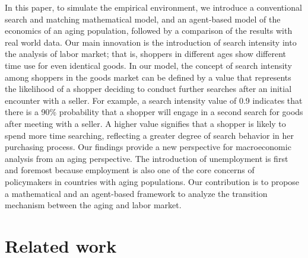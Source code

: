 \documentclass[ %
    final,
    scrbook,
    listoffigures,
    listoftables, 
    glossary]{cu-thesis}
\begin{document}
In this paper, to simulate the empirical environment, we introduce a conventional search and matching mathematical model, and an agent-based model of the economics of an aging population, followed by a comparison of the results with real world data. Our main innovation is the introduction of search intensity into the analysis of labor market; that is, shoppers in different ages show different time use for even identical goods. In our model, the concept of search intensity among shoppers in the goods market can be defined by a value that represents the likelihood of a shopper deciding to conduct further searches after an initial encounter with a seller. For example, a search intensity value of 0.9 indicates that there is a 90\% probability that a shopper will engage in a second search for goods after meeting with a seller. A higher value signifies that a shopper is likely to spend more time searching, reflecting a greater degree of search behavior in her purchasing process. Our findings provide a new perspective for macroeconomic analysis from an aging perspective. The introduction of unemployment is first and foremost because employment is also one of the core concerns of policymakers in countries with aging populations. 
Our contribution is to propose a mathematical and an agent-based framework to analyze the transition mechanism between the aging and labor market. 

\chapter{Related work}
\end{document}
